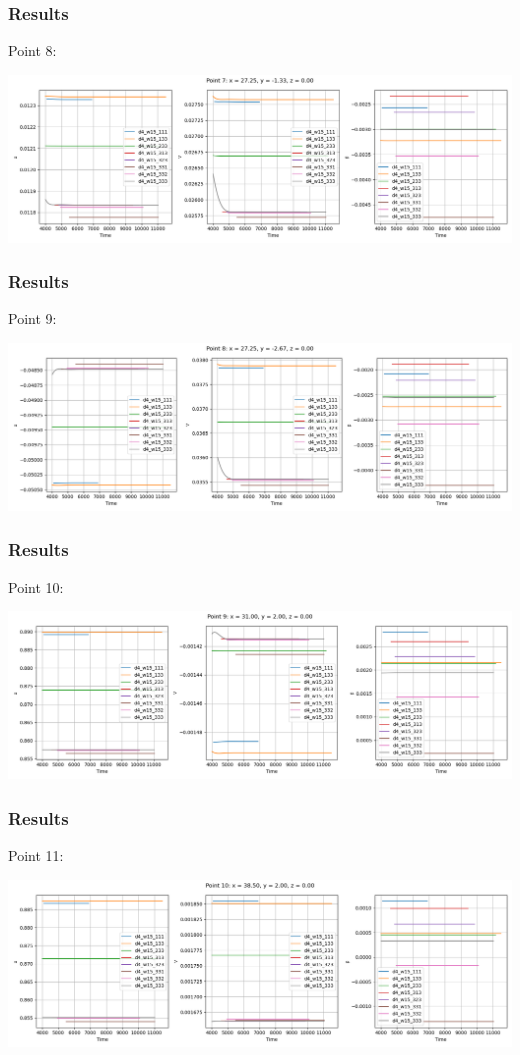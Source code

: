 \documentclass[
	aspectratio=169, %
	t, %
	onlytextwidth, %
	10pt, %
]{beamer}
\begin{document}
\begin{frame}
	\frametitle{Results}
	Point 8:

	\centering
	\includegraphics[width=\linewidth]{Images/point8.png}
\end{frame}
\begin{frame}
	\frametitle{Results}
	Point 9:

	\centering
	\includegraphics[width=\linewidth]{Images/point9.png}
\end{frame}
\begin{frame}
	\frametitle{Results}
	Point 10:

	\centering
	\includegraphics[width=\linewidth]{Images/point10.png}
\end{frame}
\begin{frame}
	\frametitle{Results}
	Point 11:

	\centering
	\includegraphics[width=\linewidth]{Images/point11.png}
\end{frame}
\end{document}
